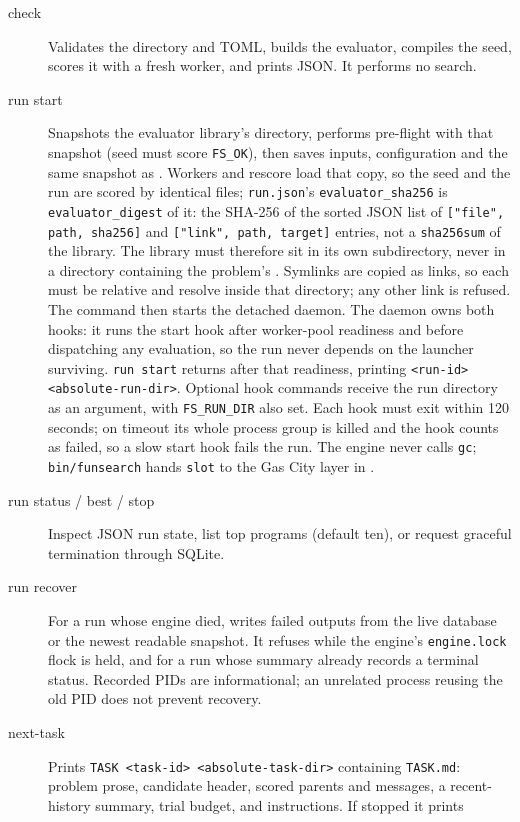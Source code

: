 \documentclass[11pt]{article}
\newcommand{\code}[1]{\texttt{#1}}
\begin{document}
\begin{description}
\item[check] Validates the directory and TOML, builds the evaluator, compiles the
seed, scores it with a fresh worker, and prints JSON. It performs no search.
\item[run start] Snapshots the evaluator library's directory, performs pre-flight
with that snapshot (seed must score \code{FS\_OK}), then saves inputs,
configuration and the same snapshot as . Workers and
rescore load that copy, so the seed and the run are scored by identical files;
\code{run.json}'s \code{evaluator\_sha256} is \code{evaluator\_digest} of it: the
SHA-256 of the sorted JSON list of \code{["file", path, sha256]} and
\code{["link", path, target]} entries, not a \code{sha256sum} of the library. The
library must therefore sit in its own subdirectory, never in a directory containing
the problem's . Symlinks are copied as links, so each must be
relative and resolve inside that directory; any other link is refused. The command then starts the detached daemon. The daemon owns both hooks:
it runs the start hook after worker-pool readiness and before dispatching any
evaluation, so the run never depends on the launcher surviving. \code{run start}
returns after that readiness, printing \code{<run-id> <absolute-run-dir>}.
Optional hook commands receive the run directory as an argument, with
\code{FS\_RUN\_DIR} also set. Each hook must exit within 120 seconds; on
timeout its whole process group is killed and the hook counts as failed, so a
slow start hook fails the run. The engine never calls \code{gc};
\code{bin/funsearch} hands \code{slot} to the Gas City layer in
.
\item[run status / best / stop] Inspect JSON run state, list top programs
(default ten), or request graceful termination through SQLite.
\item[run recover] For a run whose engine died, writes failed outputs from the
live database or the newest readable snapshot. It refuses while the engine's
\code{engine.lock} flock is held, and for a run whose summary already records a
terminal status. Recorded PIDs are informational; an unrelated process reusing
the old PID does not prevent recovery.
\item[next-task] Prints \code{TASK <task-id> <absolute-task-dir>} containing
\code{TASK.md}: problem prose, candidate header, scored parents and messages,
a recent-history summary, trial budget, and instructions. If stopped it prints

\end{description}
\end{document}

